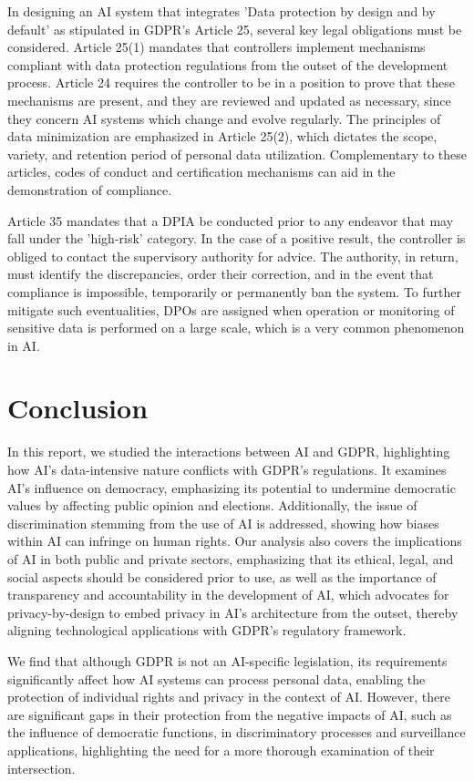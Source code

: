 \documentclass{article}
\begin{document}
In designing an AI system that integrates 'Data protection by design and by default' as stipulated in GDPR's Article 25, several key legal obligations must be considered. Article 25(1) mandates that controllers implement mechanisms compliant with data protection regulations from the outset of the development process. Article 24 requires the controller to be in a position to prove that these mechanisms are present, and they are reviewed and updated as necessary, since they concern AI systems which change and evolve regularly. The principles of data minimization are emphasized in Article 25(2), which dictates the scope, variety, and retention period of personal data utilization. Complementary to these articles, codes of conduct and certification mechanisms can aid in the demonstration of compliance.

Article 35 mandates that a DPIA be conducted prior to any endeavor that may fall under the 'high-risk' category. In the case of a positive result, the controller is obliged to contact the supervisory authority for advice. The authority, in return, must identify the discrepancies, order their correction, and in the event that compliance is impossible, temporarily or permanently ban the system. To further mitigate such eventualities, DPOs are assigned when operation or monitoring of sensitive data is performed on a large scale, which is a very common phenomenon in AI.


\section{Conclusion}
\label{sec:conclusion}

In this report, we studied the interactions between AI and GDPR, highlighting how AI's data-intensive nature conflicts with GDPR's regulations. It examines AI's influence on democracy, emphasizing its potential to undermine democratic values by affecting public opinion and elections. Additionally, the issue of discrimination stemming from the use of AI is addressed, showing how biases within AI can infringe on human rights. Our analysis also covers the implications of AI in both public and private sectors, emphasizing that its ethical, legal, and social aspects should be considered prior to use, as well as the importance of transparency and accountability in the development of AI, which advocates for privacy-by-design to embed privacy in AI's architecture from the outset, thereby aligning technological applications with GDPR's regulatory framework.

We find that although GDPR is not an AI-specific legislation, its requirements significantly affect how AI systems can process personal data, enabling the protection of individual rights and privacy in the context of AI. However, there are significant gaps in their protection from the negative impacts of AI, such as the influence of democratic functions, in discriminatory processes and surveillance applications, highlighting the need for a more thorough examination of their intersection. 



\end{document}
